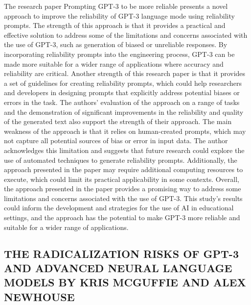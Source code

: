 \documentclass[letterpaper, 10pt, conference]{ieeeconf}
\begin{document}
    The research paper Prompting GPT-3 to be more reliable presents a novel approach to improve the reliability of GPT-3 language mode using reliability prompts. The strength of this approach is that it provides a practical and effective solution to address some of the limitations and concerns associated with the use of GPT-3, such as generation of biased or unreliable responses. By incorporating reliability prompts into the engineering process, GPT-3 can be made more suitable for a wider range of applications where accuracy and reliability are critical. 
	Another strength of this research paper is that it provides a set of guidelines for creating reliability prompts, which could help researchers and developers in designing prompts that explicitly address potential biases or errors in the task. The authors' evaluation of the approach on a range of tasks and the demonstration of significant improvements in the reliability and quality of the generated text also support the strength of their approach. 
	The main weakness of the approach is that it relies on human-created prompts, which may not capture all potential sources of bias or error in input data. The author acknowledges this limitation and suggests that future research could explore the use of automated techniques to generate reliability prompts. Additionally, the approach presented in the paper may require additional computing resources to execute, which could limit its practical applicability in some contexts. 
	Overall, the approach presented in the paper provides a promising way to address some limitations and concerns associated with the use of GPT-3. This study’s results could inform the development and strategies for the use of AI in educational settings, and the approach has the potential to make GPT-3 more reliable and suitable for a wider range of applications.

        \subsection{THE RADICALIZATION RISKS OF GPT-3 AND ADVANCED NEURAL LANGUAGE MODELS BY KRIS MCGUFFIE AND ALEX NEWHOUSE}
\end{document}
